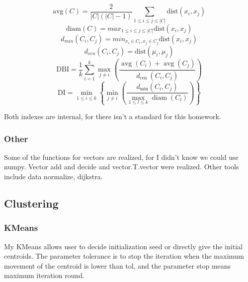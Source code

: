 \documentclass[conference]{IEEEtran}
\begin{document}
\begin{equation}
	\mathrm{avg}\left(C\right) = \frac{2}{ \left|C\right| \left(\left|C\right|-1\right)}\sum_{1\leqslant i\leq j \leqslant \left|C\right|}\mathrm{dist}\left(x_i, x_j\right)
\end{equation}
\vspace{-0.75em}
\begin{equation}
	\mathrm{diam}\left(C\right) = max_{1\leqslant i\leq j \leqslant \left|C\right|}\mathrm{dist}\left(x_i, x_j\right)
\end{equation}
\vspace{-1em}
\begin{equation}
	d_{min}\left(C_i, C_j\right) = min_{x_i \in C_i, x_j \in C_j}\mathrm{dist}\left(x_i, x_j\right)
\end{equation}
\vspace{-1em}
\begin{equation}
	d_{cen}\left(C_i, C_j\right) = \mathrm{dist}\left(\mu_i, \mu_j\right)
\end{equation}
\begin{equation}
	\mathrm{DBI}=\frac{1}{k} \sum_{i=1}^{k} \max _{j \neq i}\left(\frac{\operatorname{avg}\left(C_{i}\right)+\operatorname{avg}\left(C_{j}\right)}{d_{\text {cen }}\left(C_{i}, C_{j}\right)}\right)
	\label{DBI}
\end{equation}
\begin{equation}
	\mathrm{DI}=\min _{1 \leqslant i \leqslant k}\left\{\min _{j \neq i}\left(\frac{d_{\min }\left(C_{i}, C_{j}\right)}{\max _{1 \leqslant l \leqslant k} \operatorname{diam}\left(C_{l}\right)}\right)\right\}
\label{DI}
\end{equation}

Both indexes are internal, for there isn't a standard for this homework.

\subsubsection{\textbf{Other}}
Some of the functions for vectors are realized, for I didn't know we could use numpy. Vector add and decide and vector.T.vector were realized. Other tools include data normalize, dijkstra.

\subsection{\textbf{Clustering}}
\subsubsection{\textbf{KMeans}}
My KMeans allows user to decide initialization seed or directly give the initial centroids. The parameter tolerance is to stop the iteration when the maximum movement of the centroid is lower than tol, and the parameter stop means maximum iteration round.
\end{document}
